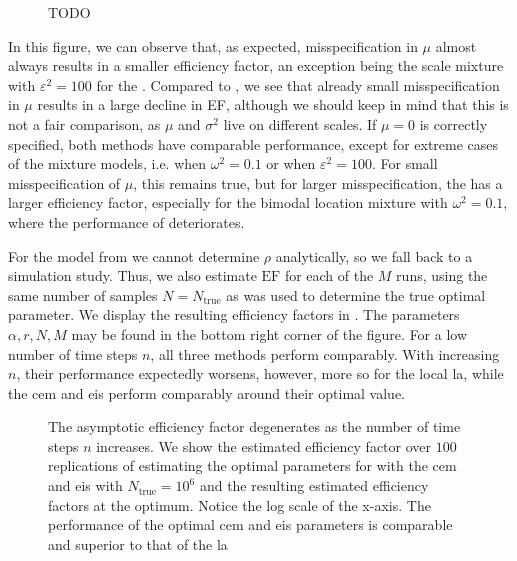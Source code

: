 \begin{figure}
    \centering

    \resizebox{\textwidth}{!}{%
    }
    \caption{{\color{red} TODO}}
    \label{fig:rho}
\end{figure} 

In this figure, we can observe that, as expected, misspecification in $\mu$ almost always results in a smaller efficiency factor, an exception being the scale mixture with $\varepsilon^{2} = 100$ for the \acem. 
Compared to , we see that already small misspecification in $\mu$ results in a large decline in EF, although we should keep in mind that this is not a fair comparison, as $\mu$ and $\sigma^{2}$ live on different scales.
If $\mu = 0 $ is correctly specified, both methods have comparable performance, except for extreme cases of the mixture models, i.e. when $\omega^{2} = 0.1$ or when $\varepsilon^{2} = 100$. 
For small misspecification of $\mu$, this remains true, but for larger misspecification, the \acem has a larger efficiency factor, especially for the bimodal location mixture with $\omega^{2} = 0.1$, where the performance of \aeis deteriorates. 


For the model from  we cannot determine $\rho$ analytically, so we fall back to a simulation study.
Thus, we also estimate $\text{EF}$ for each of the $M$ runs, using the same number of samples $N = N_{\text{true}}$ as was used to determine the true optimal parameter.
We display the resulting efficiency factors in . The parameters $\alpha, r, N, M$ may be found in the bottom right corner of the figure.
For a low number of time steps $n$, all three methods perform comparably. With increasing $n$, their performance expectedly worsens, however, more so for the local \gls{la}, while the \gls{cem} and \gls{eis} perform comparably around their optimal value. 

\begin{figure}
    \resizebox{\textwidth}{!}{%
    }
    \caption{The asymptotic efficiency factor degenerates as the number of time steps $n$ increases. We show the estimated efficiency factor over $100$ replications of estimating the optimal parameters for  with the \gls{cem} and \gls{eis} with $N_{\text{true}} = 10^{6}$ and the resulting estimated efficiency factors at the optimum. Notice the log scale of the x-axis. The performance of the optimal \gls{cem} and \gls{eis} parameters is comparable and superior to that of the \gls{la}}
    \label{fig:ef_time_dimension}
\end{figure}